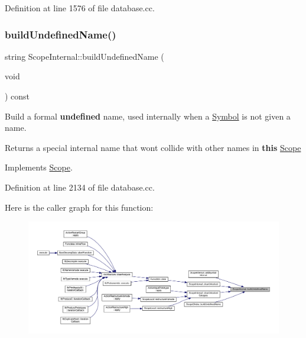 Definition at line 1576 of file database.\+cc.

\mbox{\label{class_scope_internal_a17225ae39210e0dbf1efb1a3ee847d72}} 
\subsubsection{\texorpdfstring{buildUndefinedName()}{buildUndefinedName()}}
{\footnotesize\ttfamily string Scope\+Internal\+::build\+Undefined\+Name (\begin{DoxyParamCaption}\item[{void}]{ }\end{DoxyParamCaption}) const\hspace{0.3cm}{\ttfamily [virtual]}}



Build a formal {\bfseries{undefined}} name, used internally when a \mbox{\hyperlink{class_symbol}{Symbol}} is not given a name. 

\begin{DoxyReturn}{Returns}
a special internal name that won\textquotesingle{}t collide with other names in {\bfseries{this}} \mbox{\hyperlink{class_scope}{Scope}} 
\end{DoxyReturn}


Implements \mbox{\hyperlink{class_scope_ac47d5c1c949be84a27a138be0febacb2}{Scope}}.



Definition at line 2134 of file database.\+cc.

Here is the caller graph for this function\+:
\nopagebreak
\begin{figure}[H]
\begin{center}
\leavevmode
\includegraphics[width=350pt]{class_scope_internal_a17225ae39210e0dbf1efb1a3ee847d72_icgraph}
\end{center}
\end{figure}
\mbox{\label{class_scope_internal_a6009aeaf0d3973344438fb412adccd00}} 
